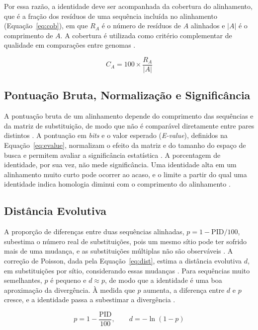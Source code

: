 Por essa razão, a identidade deve ser acompanhada da cobertura do alinhamento, que é a fração dos resíduos de uma sequência incluída no alinhamento (Equação~\ref{eq:cob}), em que $R_A$ é o número de resíduos de $A$ alinhados e $|A|$ é o comprimento de $A$. A cobertura é utilizada como critério complementar de qualidade em comparações entre genomas \cite{MorenoHagelsieb2008}.

\begin{equation}
	C_A = 100 \times \frac{R_A}{|A|}
	\label{eq:cob}
\end{equation}

\subsection{Pontuação Bruta, Normalização e Significância}

A pontuação bruta de um alinhamento depende do comprimento das sequências e da matriz de substituição, de modo que não é comparável diretamente entre pares distintos \cite{Karlin1990}. A pontuação em \textit{bits} e o valor esperado (\textit{E-value}), definidos na Equação~\ref{eq:evalue}, normalizam o efeito da matriz e do tamanho do espaço de busca e permitem avaliar a significância estatística \cite{Karlin1990, Altschul1997}. A porcentagem de identidade, por sua vez, não mede significância. Uma identidade alta em um alinhamento muito curto pode ocorrer ao acaso, e o limite a partir do qual uma identidade indica homologia diminui com o comprimento do alinhamento \cite{Rost1999}.

\subsection{Distância Evolutiva}

A proporção de diferenças entre duas sequências alinhadas, $p = 1 - \mathrm{PID}/100$, subestima o número real de substituições, pois um mesmo sítio pode ter sofrido mais de uma mudança, e as substituições múltiplas não são observáveis \cite{NeiKumar2000}. A correção de Poisson, dada pela Equação~\ref{eq:dist}, estima a distância evolutiva $d$, em substituições por sítio, considerando essas mudanças \cite{NeiKumar2000}. Para sequências muito semelhantes, $p$ é pequeno e $d \approx p$, de modo que a identidade é uma boa aproximação da divergência. À medida que $p$ aumenta, a diferença entre $d$ e $p$ cresce, e a identidade passa a subestimar a divergência \cite{NeiKumar2000}.

\begin{equation}
	p = 1 - \frac{\mathrm{PID}}{100}, \qquad d = -\ln(1 - p)
	\label{eq:dist}
\end{equation}

